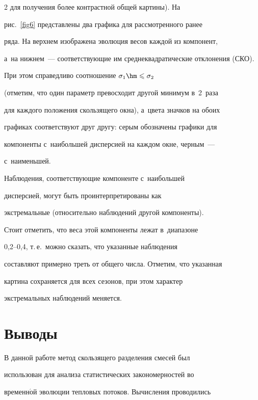 \begin{multicols}{2}
для получения более контрастной общей картины). На


рис.~\ref{fig6} пред\-став\-ле\-ны два графика для рассмотренного ранее


ряда. На верхнем изображена эволюция весов каждой из компонент, 


а~на нижнем~--- соответствующие им среднеквадратические отклонения (СКО).


При этом справедливо соотношение $\sigma_1\hm\leqslant\sigma_2$


(отметим, что один параметр превосходит другой минимум в~2~раза


для каждого положения скользящего окна), а~цвета значков на обоих


графиках соответствуют друг другу: серым обозначены графики для


компоненты с~наибольшей дисперсией на каждом окне, черным~--- 


с~наименьшей.











Наблюдения, соответствующие компоненте с~наибольшей


дисперсией, могут быть проинтерпретированы как


экстремальные (относительно наблюдений другой компоненты).


Стоит отметить, что веса этой компоненты лежат в~диапазоне


0,2--0,4, т.\,е.\ можно сказать, что указанные наблюдения


составляют примерно треть от общего числа. Отметим, что указанная


картина сохраняется для всех сезонов, при этом характер


экстремальных наблюдений меняется.





\section{Выводы}





В данной работе метод скользящего разделения смесей был


использован для анализа статистических закономерностей во


временн$\acute{\mbox{о}}$й эволюции тепловых потоков. Вычисления проводились 



\end{multicols}
